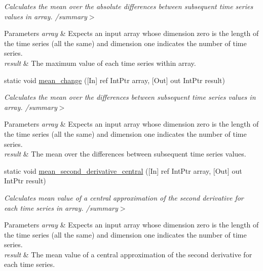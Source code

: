 \begin{DoxyCompactItemize}
\begin{DoxyCompactList}\small\item\em Calculates the mean over the absolute differences between subsequent time series values in array. /summary$>$ 
\begin{DoxyParams}{Parameters}
{\em array} & Expects an input array whose dimension zero is the length of the time series (all the same) and dimension one indicates the number of time series.\\
\hline
{\em result} & The maximum value of each time series within array.\\
\hline
\end{DoxyParams}
\end{DoxyCompactList}\item 
static void \mbox{\hyperlink{classkhiva_1_1interop_1_1_d_l_l_features_abc61c1c3c5f9aa52732f8631fdd7db6d}{mean\+\_\+change}} (\mbox{[}In\mbox{]} ref Int\+Ptr array, \mbox{[}Out\mbox{]} out Int\+Ptr result)
\begin{DoxyCompactList}\small\item\em Calculates the mean over the differences between subsequent time series values in array. /summary$>$ 
\begin{DoxyParams}{Parameters}
{\em array} & Expects an input array whose dimension zero is the length of the time series (all the same) and dimension one indicates the number of time series.\\
\hline
{\em result} & The mean over the differences between subsequent time series values.\\
\hline
\end{DoxyParams}
\end{DoxyCompactList}\item 
static void \mbox{\hyperlink{classkhiva_1_1interop_1_1_d_l_l_features_a3676b48b12dc2a86e796c29ab37ec02f}{mean\+\_\+second\+\_\+derivative\+\_\+central}} (\mbox{[}In\mbox{]} ref Int\+Ptr array, \mbox{[}Out\mbox{]} out Int\+Ptr result)
\begin{DoxyCompactList}\small\item\em Calculates mean value of a central approximation of the second derivative for each time series in array. /summary$>$ 
\begin{DoxyParams}{Parameters}
{\em array} & Expects an input array whose dimension zero is the length of the time series (all the same) and dimension one indicates the number of time series.\\
\hline
{\em result} & The mean value of a central approximation of the second derivative for each time series.\\

\end{DoxyParams}
\end{DoxyCompactList}
\end{DoxyCompactItemize}
